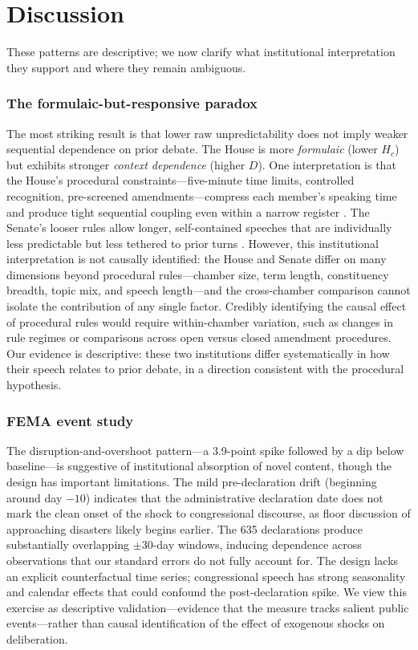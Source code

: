 \documentclass[12pt]{article}
\newcommand{\Hc}{H_c}
\newcommand{\DI}{\mathit{D}}
\begin{document}
\section{Discussion}

These patterns are descriptive; we now clarify what institutional interpretation they support and where they remain ambiguous.

\subsubsection*{The formulaic-but-responsive paradox} The most striking result is that lower raw unpredictability does not imply weaker sequential dependence on prior debate. The House is more \textit{formulaic} (lower $\Hc$) but exhibits stronger \textit{context dependence} (higher $\DI$). One interpretation is that the House's procedural constraints---five-minute time limits, controlled recognition, pre-screened amendments---compress each member's speaking time and produce tight sequential coupling even within a narrow register \citep{perssonTabellini2003, jenkins2006}. The Senate's looser rules allow longer, self-contained speeches that are individually less predictable but less tethered to prior turns \citep{lee2009}. However, this institutional interpretation is not causally identified: the House and Senate differ on many dimensions beyond procedural rules---chamber size, term length, constituency breadth, topic mix, and speech length---and the cross-chamber comparison cannot isolate the contribution of any single factor. Credibly identifying the causal effect of procedural rules would require within-chamber variation, such as changes in rule regimes or comparisons across open versus closed amendment procedures. Our evidence is descriptive: these two institutions differ systematically in how their speech relates to prior debate, in a direction consistent with the procedural hypothesis.

\subsubsection*{FEMA event study} The disruption-and-overshoot pattern---a 3.9-point spike followed by a dip below baseline---is suggestive of institutional absorption of novel content, though the design has important limitations. The mild pre-declaration drift (beginning around day $-10$) indicates that the administrative declaration date does not mark the clean onset of the shock to congressional discourse, as floor discussion of approaching disasters likely begins earlier. The 635 declarations produce substantially overlapping $\pm30$-day windows, inducing dependence across observations that our standard errors do not fully account for. The design lacks an explicit counterfactual time series; congressional speech has strong seasonality and calendar effects that could confound the post-declaration spike. We view this exercise as descriptive validation---evidence that the measure tracks salient public events---rather than causal identification of the effect of exogenous shocks on deliberation.
\end{document}
